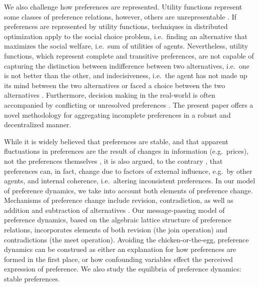 \documentclass[conference]{ieeeconf}
\begin{document}
We also challenge how preferences are represented. Utility functions represent some classes of preference relations, however, others are unrepresentable \cite{Beardon2002}. If preferences are represented by utility functions, techniques in distributed optimization apply to the social choice problem, i.e.~finding an alternative that maximizes the social welfare, i.e.~sum of utilities of agents. Nevertheless, utility functions, which represent complete and transitive preferences, are not capable of capturing the distinction between indifference between two alternatives, i.e.~one is not better than the other, and indecisiveness, i.e.~the agent has not made up its mind between the two alternatives or faced a choice between the two alternatives \cite{eliaz2006}. Furthermore, decision making in the real-world is often accompanied by conflicting or unresolved preferences \cite{levi1990}. The present paper offers a novel methodology for aggregating incomplete preferences in a robust and decentralized manner.

While it is widely believed that preferences are stable, and that apparent fluctuations in preferences are the result of changes in information (e.g.~prices), not the preferences themselves \cite{stigler1977}, it is also argued, to the contrary \cite{hansen1995}, that preferences can, in fact, change due to factors of external influence, e.g.~by other agents, and internal coherence, i.e.~altering inconsistent preferences. In our model of preference dynamics, we take into account both elements of preference change. Mechanisms of preference change include revision, contradiction, as well as addition and subtraction of alternatives \cite{hansen1995}. Our message-passing model of preference dynamics, based on the algebraic lattice structure of preference relations, incorporates elements of both revision (the join operation) and contradictions (the meet operation). Avoiding the chicken-or-the-egg, preference dynamics can be construed as either an explanation for how preferences are formed in the first place, or how confounding variables effect the perceived expression of preference. We also study the equilibria of preference dynamics: stable preferences.
\end{document}
